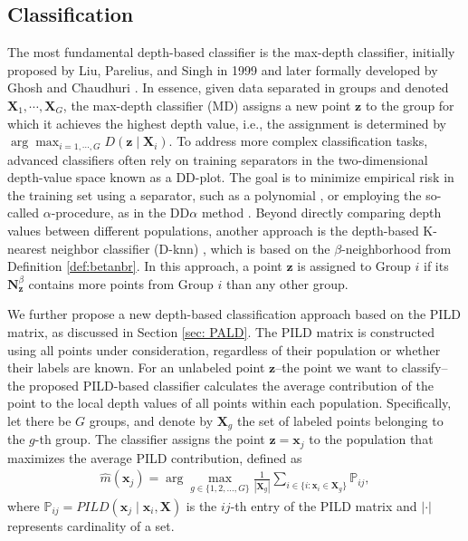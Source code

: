 \documentclass[final,3p,times]{elsarticle}
\newcommand{\vecx}{\mathbf{x}}
\newcommand{\vecX}{\mathbf{X}}
\newcommand{\vecN}{\mathbf{N}}
\newcommand{\vecz}{\mathbf{z}}
\newcommand{\argmax}{\arg\max}
\begin{document}
\subsection{Classification}
The most fundamental depth-based classifier is the max-depth classifier, initially proposed by Liu, Parelius, and Singh in 1999 \cite{liu1999multivariate} and later formally developed by Ghosh and Chaudhuri \cite{ghosh2005maximum}. In essence, given data separated in groups and denoted $\vecX_1, \cdots, \vecX_G$, the max-depth classifier (MD) assigns a new point $\vecz$ to the group for which it achieves the highest depth value, i.e., the assignment is determined by $\argmax_{i=1, \cdots, G} D(\vecz \mid \vecX_i)$. To address more complex classification tasks, advanced classifiers often rely on training separators in the two-dimensional depth-value space known as a DD-plot. The goal is to minimize empirical risk in the training set using a separator, such as a polynomial \cite{li2012dd}, or employing the so-called $\alpha$-procedure, as in the DD$\alpha$ method \cite{lange2014fast}. Beyond directly comparing depth values between different populations, another approach is the depth-based K-nearest neighbor classifier (D-knn) \cite{paindaveine2015nonparametrically}, which is based on the $\beta$-neighborhood from Definition \ref{def:betanbr}. In this approach, a point $\vecz$ is assigned to Group $i$ if its $\vecN_\vecz^\beta$ contains more points from Group $i$ than any other group.

We further propose a new depth-based classification approach based on the PILD matrix, as discussed in Section \ref{sec: PALD}. The PILD matrix is constructed using all points under consideration, regardless of their population or whether their labels are known. For an unlabeled point $\vecz$--the point we want to classify--the proposed PILD-based classifier calculates the average contribution of the point to the local depth values of all points within each population. Specifically, let there be $G$ groups, and denote by $ \vecX_g $ the set of labeled points belonging to the $g$-th group. The classifier assigns the point $ \vecz=\vecx_j $ to the population that maximizes the average PILD contribution, defined as
\begin{eqnarray}
     \hat{m}(\vecx_j) = \argmax_{g \in \{1, 2, \ldots, G\}} \frac{1}{|\vecX_g|}\sum_{i\in\{i: \vecx_i\in\vecX_g\}} \mathbb{P}_{ij},
\end{eqnarray}
where $\mathbb{P}_{ij}=PILD(\vecx_j \mid \vecx_i, \vecX)$ is the $ij$-th entry of the PILD matrix and $|\cdot|$ represents cardinality of a set.
\end{document}
